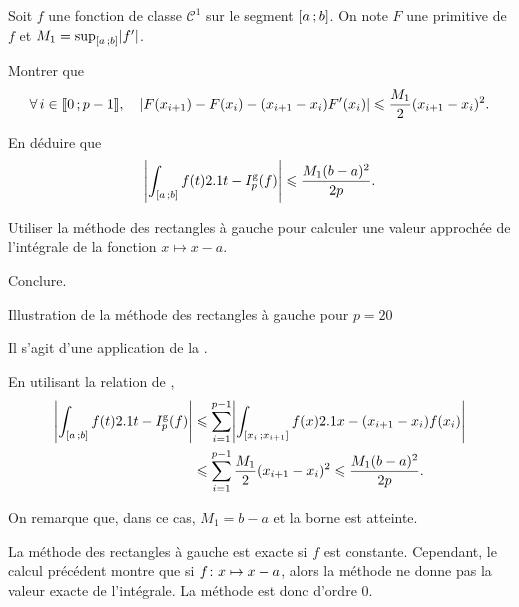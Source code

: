 \begin{exercice}
Soit $f$ une fonction de classe $\mathscr{C}^1$ sur le segment $\interff{a}{b}$. On note $F$ une primitive de $f$ et $M_1 = \sup_{\interff{a}{b}} \module{f'}$.
\begin{questions}
\item Montrer que
\[
\forall i \in \interent{0}{p-1},\quad 
\module{F(x_{i+1}) - F(x_i) - (x_{i+1} - x_i) F'(x_i)} \leqslant \frac{M_1}{2} (x_{i+1}-x_i)^2.
\]

\item En déduire que
\[
\module{\int_{\interff{a}{b}} f(t) \d t - I_p^\mathrm{g}(f)}
\leqslant \frac{M_1 (b-a)^2}{2 p}.
\]

\item Utiliser la méthode des rectangles à gauche pour calculer une valeur approchée de l'intégrale de la fonction $x \mapsto x - a$.

\item Conclure.
\end{questions}
\end{exercice}

\begin{marginfigure}[3cm]
    \centering
    
    \caption{Illustration de la méthode des rectangles à gauche pour $p=20$}
\end{marginfigure}

\begin{elemsolution}

\begin{reponses}
\item Il s'agit d'une application de la .

\item En utilisant la relation de ,
\begin{align*}
\module{\int_{\interff{a}{b}} f(t) \d t - I_p^\mathrm{g}(f)}
&\leqslant \sum_{i=1}^{p-1} \module{\int_{\interff{x_i}{x_{i+1}}} f(x) \d x - (x_{i+1} - x_i) f(x_i)}\\
&\leqslant \sum_{i=1}^{p-1} \frac{M_1}{2} (x_{i+1} - x_i)^2
\leqslant \frac{M_1 (b-a)^2}{2 p}.
\end{align*}

\item On remarque que, dans ce cas, $M_1 = b - a$ et la borne est atteinte.

\item La méthode des rectangles à gauche est exacte si $f$ est constante. Cependant, le calcul précédent montre que si $\fonctionligne[f]{x}{x - a}$, alors la méthode ne donne pas la valeur exacte de l'intégrale. La méthode est donc d'ordre $0$.
\end{reponses}
\end{elemsolution}

